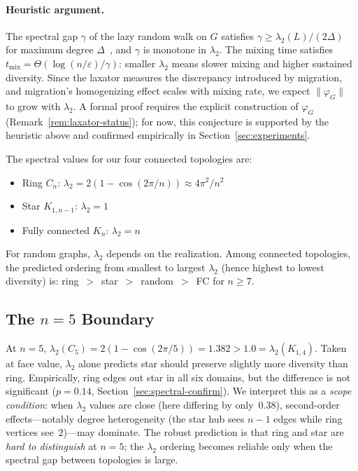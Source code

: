 \documentclass[submission,copyright,creativecommons]{eptcs}
\begin{document}
\paragraph{Heuristic argument.}
The spectral gap $\gamma$ of the lazy random walk on $G$ satisfies
$\gamma \geq \lambda_2(L)/(2\Delta)$ for maximum degree
$\Delta$~\cite{levin2009markov}, and $\gamma$ is monotone in
$\lambda_2$. The mixing time satisfies
$t_{\mathrm{mix}} = \Theta(\log(n/\varepsilon)/\gamma)$: smaller
$\lambda_2$ means slower mixing and higher sustained diversity.
Since the laxator measures the discrepancy introduced by
migration, and migration's homogenizing effect scales with
mixing rate, we expect $\|\varphi_G\|$ to grow with $\lambda_2$.
A formal proof requires the explicit construction of $\varphi_G$
(Remark~\ref{rem:laxator-status}); for now, this conjecture is
supported by the heuristic above and confirmed empirically in
Section~\ref{sec:experiments}.

The spectral values for our four connected topologies are:
\begin{itemize}
\item Ring $C_n$: $\lambda_2 = 2(1 - \cos(2\pi/n)) \approx 4\pi^2/n^2$
\item Star $K_{1,n-1}$: $\lambda_2 = 1$
\item Fully connected $K_n$: $\lambda_2 = n$
\end{itemize}
For random graphs, $\lambda_2$ depends on the realization.
Among connected topologies, the predicted ordering from smallest to
largest $\lambda_2$ (hence highest to lowest diversity) is:
ring~$>$~star~$>$~random~$>$~FC for $n \geq 7$.

\subsection{The \texorpdfstring{$n{=}5$}{n=5} Boundary}

At $n{=}5$, $\lambda_2(C_5) = 2(1 - \cos(2\pi/5)) = 1.382 > 1.0 =
\lambda_2(K_{1,4})$. Taken at face value, $\lambda_2$ alone
predicts star should preserve slightly more diversity than ring.
Empirically, ring edges out star in all six domains, but the
difference is not significant ($p = 0.14$, Section~\ref{sec:spectral-confirm}).
We interpret this as a \emph{scope condition}: when $\lambda_2$
values are close (here differing by only~$0.38$), second-order
effects---notably degree heterogeneity (the star hub sees $n{-}1$
edges while ring vertices see~$2$)---may dominate.
The robust prediction is that ring and star are
\emph{hard to distinguish} at $n{=}5$; the $\lambda_2$ ordering
becomes reliable only when the spectral gap between topologies
is large.
\end{document}
